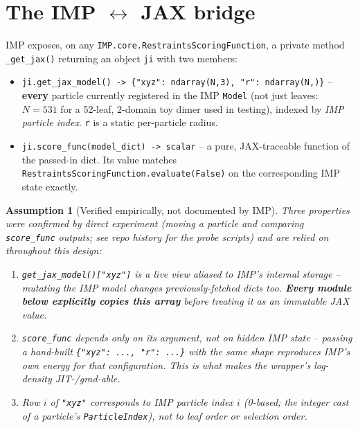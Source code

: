 \documentclass[11pt]{article}
\newtheorem{assumption}{Assumption}
\begin{document}
\section{The IMP $\leftrightarrow$ JAX bridge}
\label{sec:bridge}

IMP exposes, on any \texttt{IMP.core.RestraintsScoringFunction}, a private
method \texttt{\_get\_jax()} returning an object \texttt{ji} with two members:

\begin{itemize}
  \item \texttt{ji.get\_jax\_model() -> \{"xyz": ndarray(N,3), "r": ndarray(N,)\}} --
    \textbf{every} particle currently registered in the IMP \texttt{Model}
    (not just leaves: $N=531$ for a 52-leaf, 2-domain toy dimer used in
    testing), indexed by \emph{IMP particle index}. \texttt{r} is a static
    per-particle radius.
  \item \texttt{ji.score\_func(model\_dict) -> scalar} -- a pure, JAX-traceable
    function of the passed-in dict. Its value matches
    \texttt{RestraintsScoringFunction.evaluate(False)} on the corresponding
    IMP state exactly.
\end{itemize}

\begin{assumption}[Verified empirically, not documented by IMP]
\label{ass:bridge}
Three properties were confirmed by direct experiment (moving a particle and
comparing \texttt{score\_func} outputs; see repo history for the probe
scripts) and are relied on throughout this design:
\begin{enumerate}
  \item \texttt{get\_jax\_model()["xyz"]} is a \emph{live view} aliased to IMP's
    internal storage -- mutating the IMP model changes previously-fetched
    dicts too. \textbf{Every module below explicitly copies this array}
    before treating it as an immutable JAX value.
  \item \texttt{score\_func} depends \emph{only} on its argument, not on
    hidden IMP state -- passing a hand-built \texttt{\{"xyz": ..., "r": ...\}}
    with the same shape reproduces IMP's own energy for that configuration.
    This is what makes the wrapper's log-density JIT-/grad-able.
  \item Row $i$ of \texttt{"xyz"} corresponds to IMP particle index $i$
    (0-based; the integer cast of a particle's \texttt{ParticleIndex}),
    not to leaf order or selection order.
\end{enumerate}
\end{assumption}
\end{document}
